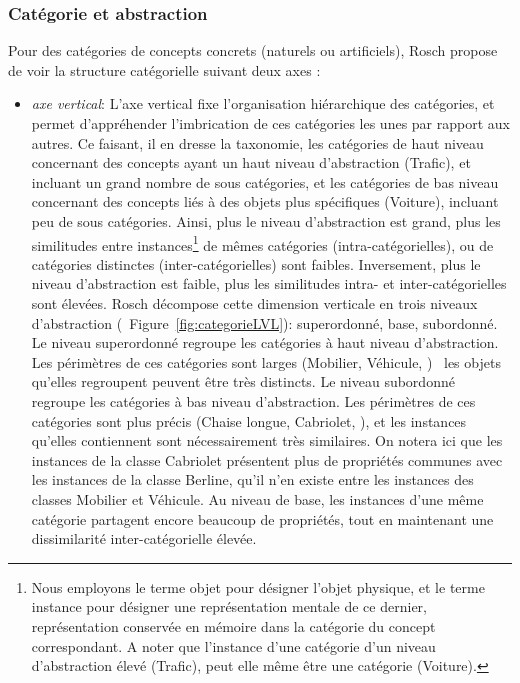 \subsubsection{Catégorie et abstraction}
 \label{sec:ch3_categoEtAbstract}
 
Pour des catégories de concepts concrets (naturels ou artificiels), Rosch propose de voir la structure catégorielle suivant deux axes \citep[p. 30-41]{rosch1978cognition}:

\begin{itemize}
\item \textit{axe vertical}: L'axe vertical fixe l'organisation hiérarchique des catégories, et permet d'appréhender l'imbrication de ces catégories les unes par rapport aux autres. Ce faisant, il en dresse la taxonomie, les catégories de haut niveau concernant des concepts ayant un haut niveau d'abstraction (Trafic), et incluant un grand nombre de sous catégories, et les catégories de bas niveau concernant des concepts liés à des objets plus spécifiques (Voiture), incluant peu de sous catégories. Ainsi, plus le niveau d'abstraction est grand, plus les similitudes entre instances\footnote{Nous employons le terme objet pour désigner l'objet physique, et le terme instance pour désigner une représentation mentale de ce dernier, représentation conservée en mémoire dans la catégorie du concept correspondant. A noter que l'instance d'une catégorie d'un niveau d'abstraction élevé (Trafic), peut elle même être une catégorie (Voiture).} de mêmes catégories (intra-catégorielles), ou de catégories distinctes (inter-catégorielles) sont faibles. Inversement, plus le niveau d'abstraction est faible, plus les similitudes intra- et inter-catégorielles sont élevées. Rosch décompose cette dimension verticale en trois niveaux d'abstraction (\cf~Figure~\ref{fig:categorieLVL}): superordonné, base, subordonné. Le niveau superordonné regroupe les catégories à haut niveau d'abstraction. Les périmètres de ces catégories sont larges (Mobilier, Véhicule, \etc) \ie~les objets qu'elles regroupent peuvent être très distincts. Le niveau subordonné regroupe les catégories à bas niveau d'abstraction. Les périmètres de ces catégories sont plus précis (Chaise longue, Cabriolet, \etc), et les instances qu'elles contiennent sont nécessairement très similaires. On notera ici que les instances de la classe Cabriolet présentent plus de propriétés communes avec les instances de la classe Berline, qu'il n'en existe entre les instances des classes Mobilier et Véhicule. Au niveau de base, les instances d'une même catégorie partagent encore beaucoup de propriétés, tout en maintenant une dissimilarité inter-catégorielle élevée.

\end{itemize}
